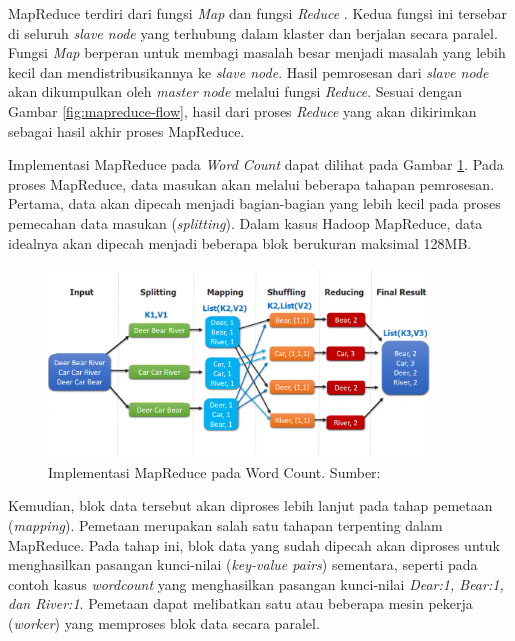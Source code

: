 MapReduce terdiri dari fungsi \textit{Map} dan fungsi \textit{Reduce} \cite{gandomiHybSMRPHybridScheduling2019}. Kedua fungsi ini tersebar di seluruh \textit{slave node} yang terhubung dalam klaster dan berjalan secara paralel. Fungsi \textit{Map} berperan untuk membagi masalah besar menjadi masalah yang lebih kecil dan mendistribusikannya ke \textit{slave node}. Hasil pemrosesan dari \textit{slave node} akan dikumpulkan oleh \textit{master node} melalui fungsi \textit{Reduce}. Sesuai dengan Gambar \ref{fig:mapreduce-flow}, hasil dari proses \textit{Reduce} yang akan dikirimkan sebagai hasil akhir proses MapReduce.  

Implementasi MapReduce pada \textit{Word Count}\cite{KOMPARASIKECEPATANHADOOP} dapat dilihat pada Gambar \ref{fig:mapreduce-wordcount}. Pada proses MapReduce, data masukan akan melalui beberapa tahapan pemrosesan. Pertama, data akan dipecah menjadi bagian-bagian yang lebih kecil pada proses pemecahan data masukan (\textit{splitting}). Dalam kasus Hadoop MapReduce, data idealnya akan dipecah menjadi beberapa blok berukuran maksimal 128MB.

\begin{figure}[h!]
    \centering
    \includegraphics[width=0.9\textwidth]{figures/ch02/map-reduce-word-count-oreilly.png}
    \caption{Implementasi MapReduce pada Word Count. Sumber:  \cite{MapReduceDistributedComputing}}
    \label{fig:mapreduce-wordcount}
\end{figure}

Kemudian, blok data tersebut akan diproses lebih lanjut pada tahap pemetaan (\textit{mapping}). Pemetaan merupakan salah satu tahapan terpenting dalam MapReduce. Pada tahap ini, blok data yang sudah dipecah akan diproses untuk menghasilkan pasangan kunci-nilai (\textit{key-value pairs}) sementara, seperti pada contoh kasus \textit{wordcount} yang menghasilkan pasangan kunci-nilai \textit{Dear:1, Bear:1, dan River:1}. Pemetaan dapat melibatkan satu atau beberapa mesin pekerja (\textit{worker}) yang memproses blok data secara paralel.

